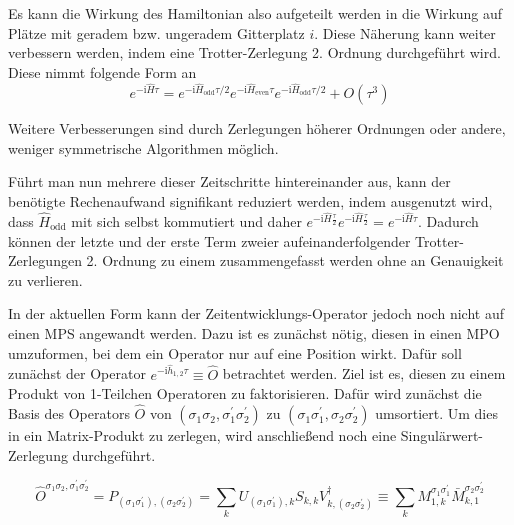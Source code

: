 \documentclass[10pt,a4paper]{report}
\begin{document}
Es kann die Wirkung des Hamiltonian also aufgeteilt werden in die Wirkung auf Plätze mit geradem bzw. ungeradem Gitterplatz $i$. Diese Näherung kann weiter verbessern werden, indem eine Trotter-Zerlegung 2. Ordnung durchgeführt wird. Diese nimmt folgende Form an
\begin{equation}
e^{-\text{i}\hat{H}\tau}=e^{-\text{i}\hat{H}_{\text{odd}}\tau/2}e^{-\text{i}\hat{H}_{\text{even}}\tau}e^{-\text{i}\hat{H}_{\text{odd}}\tau/2}+O(\tau^3)
\end{equation}

Weitere Verbesserungen sind durch Zerlegungen höherer Ordnungen oder andere, weniger symmetrische Algorithmen möglich.

Führt man nun mehrere dieser Zeitschritte hintereinander aus, kann der benötigte Rechenaufwand signifikant reduziert werden, indem ausgenutzt wird, dass $\hat{H}_{\text{odd}}$ mit sich selbst kommutiert und daher $e^{-\text{i}\hat{H}\frac{\tau}{2}}e^{-\text{i}\hat{H}\frac{\tau}{2}}=e^{-\text{i}\hat{H}\tau}$. Dadurch können der letzte und der erste Term zweier aufeinanderfolgender Trotter-Zerlegungen 2. Ordnung zu einem zusammengefasst werden ohne an Genauigkeit zu verlieren.\par

In der aktuellen Form kann der Zeitentwicklungs-Operator jedoch noch nicht auf einen MPS angewandt werden. Dazu ist es zunächst nötig, diesen in einen MPO umzuformen, bei dem ein Operator nur auf eine Position wirkt. Dafür soll zunächst der Operator $e^{-\text{i}\hat{h}_{1,2}\tau}\equiv \hat{O}$ betrachtet werden. Ziel ist es, diesen zu einem Produkt von 1-Teilchen Operatoren zu faktorisieren. Dafür wird zunächst die Basis des Operators $\hat{O}$ von $(\sigma_1\sigma_2,\sigma_1^{\prime}\sigma_2^{\prime})$ zu $(\sigma_1\sigma_1^{\prime},\sigma_2\sigma_2^{\prime})$ umsortiert. Um dies in ein Matrix-Produkt zu zerlegen, wird anschließend noch eine Singulärwert-Zerlegung durchgeführt. 

\begin{equation}
\hat{O}^{\sigma_1 \sigma_2,\sigma_1^\prime \sigma_2^\prime}=P_{(\sigma_1 \sigma_1^\prime),(\sigma_2 \sigma_2^\prime)}=\sum_k U_{(\sigma_1 \sigma_1^\prime),k}S_{k,k}V_{k,(\sigma_2 \sigma_2^\prime)}^\dagger\equiv\sum_k M_{1,k}^{\sigma_1 \sigma_1^\prime} \bar{M}_{k,1}^{\sigma_2 \sigma_2^\prime}
\end{equation}
\end{document}
